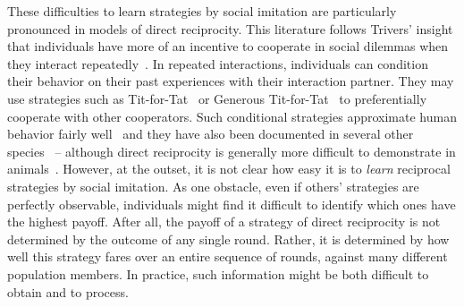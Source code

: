 \documentclass[11pt]{article}
\theoremstyle{plainCl1}
\theoremstyle{plainCl2}
\begin{document}
These difficulties to learn strategies by social imitation are particularly pronounced in models of direct reciprocity. 
This literature follows Trivers' insight that individuals have more of an incentive to cooperate in social dilemmas when they interact repeatedly~\citep{trivers1971evolution}. 
In repeated interactions, individuals can condition their behavior on their past experiences with their interaction partner. 
They may use strategies such as Tit-for-Tat~\citep{rapoport:book:1965,axelrod1981evolution} or Generous Tit-for-Tat~\citep{molander:jcr:1985,Nowak1992tit} to preferentially cooperate with other cooperators. 
Such conditional strategies approximate human behavior fairly well~\citep{fischbacher:EconL:2001,Rand:TCS:2013,DalBo:AER:2019,Rossetti:ETH:2023} and they have also been documented in several other species~\citep{Carter:PRSB:2013,Schweinfurth:AnBehav:2019,Voelkl:PNAS:2015} -- although direct reciprocity is generally more difficult to demonstrate in animals~\citep{CluttonBrock:Nature:2009,Silk:CurrentBiology:2013,taborsky:CurrentBiology:2013}.
However, at the outset, it is not clear how easy it is to {\it learn} reciprocal strategies by social imitation. 
As one obstacle, even if others' strategies are perfectly observable, individuals might find it difficult to identify which ones have the highest payoff. 
After all, the payoff of a strategy of direct reciprocity is not determined by the outcome of any single round.
Rather, it is determined by how well this strategy fares over an entire sequence of rounds, against many different population members. 
In practice, such information might be both difficult to obtain and to process. 

\end{document}
